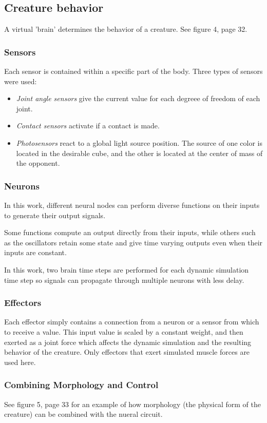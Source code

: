 \documentclass[12pt]{article}
\begin{document}
\subsection{Creature behavior}
A virtual 'brain' determines the behavior of a creature. See figure 4, page 32.

\subsubsection{Sensors}
Each sensor is contained within a specific part of the body. Three types of sensors were used:
\begin{itemize}
\item \textit{Joint angle sensors} give the current value for each degreee of freedom of each joint.
\item \textit{Contact sensors} activate if a contact is made.
\item \textit{Photosensors} react to a global light source position. The source of one color is located in the desirable cube, and the other is located at the center of mass of the opponent.
\end{itemize}

\subsubsection{Neurons}
In this work, different neural nodes can perform diverse functions on their inputs to generate their output signals.

Some functions compute an output directly from their inputs, while others such as the oscillators retain some state and give time varying outputs even when their inputs are constant.

In this work, two brain time steps are performed for each dynamic simulation time step so signals can propagate through multiple neurons with less delay.

\subsubsection{Effectors}
Each effector simply contains a connection from a neuron or a sensor from which to receive a value. This input value is scaled by a constant weight, and then exerted as a joint force which affects the dynamic simulation and the resulting behavior of the creature. Only effectors that exert simulated muscle forces are used here.

\subsubsection{Combining Morphology and Control}
See figure 5, page 33 for an example of how morphology (the physical form of the creature) can be combined with the nueral circuit.
\end{document}
